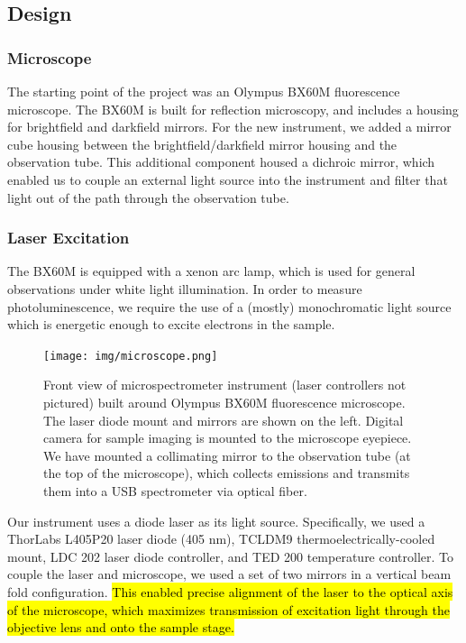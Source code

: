 \subsection{Design}

\subsubsection{Microscope}

The starting point of the project was an Olympus BX60M fluorescence microscope. The BX60M is built for reflection microscopy, and includes a housing for brightfield and darkfield mirrors. For the new instrument, we added a mirror cube housing between the brightfield/darkfield mirror housing and the observation tube. This additional component housed a dichroic mirror, which enabled us to couple an external light source into the instrument and filter that light out of the path through the observation tube.

\subsubsection{Laser Excitation}
The BX60M is equipped with a xenon arc lamp, which is used for general observations under white light illumination. In order to measure photoluminescence, we require the use of a (mostly) monochromatic light source which is energetic enough to excite electrons in the sample.

\begin{figure}[H]
    \centering
    \texttt{[image: img/microscope.png]}
    \caption[Front view of microspectrometer instrument.]{Front view of microspectrometer instrument (laser controllers not pictured) built around Olympus BX60M fluorescence microscope. The laser diode mount and mirrors are shown on the left. Digital camera for sample imaging is mounted to the microscope eyepiece. We have mounted a collimating mirror to the observation tube (at the top of the microscope), which collects emissions and transmits them into a USB spectrometer via optical fiber.}
    \label{img:microscope}
\end{figure}

Our instrument uses a diode laser as its light source. Specifically, we used a ThorLabs L405P20 laser diode (405 nm), TCLDM9 thermoelectrically-cooled mount, LDC 202 laser diode controller, and TED 200 temperature controller. To couple the laser and microscope, we used a set of two mirrors in a vertical beam fold configuration. \hl{This enabled precise alignment of the laser to the optical axis of the microscope, which maximizes transmission of excitation light through the objective lens and onto the sample stage.}

